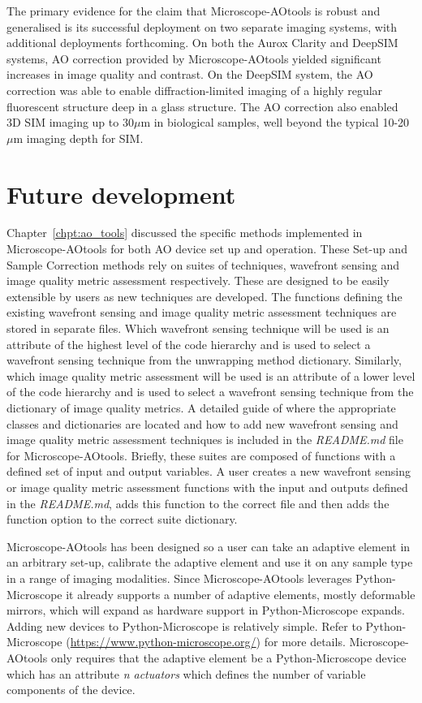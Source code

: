 The primary evidence for the claim that Microscope-AOtools is robust and 
generalised is its successful deployment on two separate imaging systems, 
with additional deployments forthcoming. On both the Aurox Clarity and 
DeepSIM systems, AO correction provided by Microscope-AOtools yielded 
significant increases in image quality and contrast. On the DeepSIM system, 
the AO correction was able to enable diffraction-limited imaging of a highly 
regular fluorescent structure deep in a glass structure. The AO correction 
also enabled 3D SIM imaging up to 30$\mu$m in biological samples, well beyond 
the typical 10-20$\mu$m imaging depth for 
SIM\cite{schermelleh2019super,wu2018faster}. 

\section{Future development}
\label{sec:future_dev}

Chapter~\ref{chpt:ao_tools} discussed the specific methods implemented in 
Microscope-AOtools for both AO device set up and operation. These Set-up 
and  Sample Correction methods rely on suites of techniques, wavefront 
sensing and image quality metric assessment respectively. These are 
designed to be easily extensible by users as new techniques are developed. 
The functions defining the existing wavefront sensing and image quality 
metric assessment techniques are stored in separate files. Which wavefront 
sensing technique will be used is an attribute of the highest level
of the code hierarchy and is used to select a wavefront sensing technique 
from the unwrapping method dictionary. Similarly, which image quality 
metric assessment will be used is an attribute of a lower level	of the 
code hierarchy and is used to select a wavefront sensing technique from 
the dictionary of image quality metrics. A detailed guide of where the 
appropriate classes and dictionaries are located and how to add new 
wavefront sensing and image quality metric assessment techniques is 
included in the \textit{README.md} file for Microscope-AOtools. Briefly, 
these suites are composed of functions with a defined set of input and 
output variables. A user creates a new wavefront sensing or image 
quality metric assessment functions with the input and outputs defined 
in the \textit{README.md}, adds this function to the correct file and 
then adds the function option to the correct suite dictionary.

Microscope-AOtools has been designed so a user can take an adaptive element 
in an arbitrary set-up, calibrate the adaptive element and use it on any 
sample type in a range of imaging modalities. Since Microscope-AOtools 
leverages Python-Microscope it already supports a number of adaptive 
elements, mostly deformable mirrors, which will expand as hardware support 
in Python-Microscope expands. Adding new devices to Python-Microscope is 
relatively simple. Refer to Python-Microscope 
(\url{https://www.python-microscope.org/}) for more details. 
Microscope-AOtools only requires that the adaptive element be a 
Python-Microscope device which has an attribute \textit{n\textunderscore 
	actuators} which defines the number of variable components of the device.

